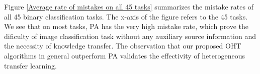 \documentclass[letterpaper]{article}
\begin{document}
Figure \ref{Average rate of mistakes on all 45 tasks} summarizes the mistake rates of all 45 binary classification tasks.
The x-axis of the figure refers to the 45 tasks.
We see that on most tasks, PA has the very high mistake rate, which prove the dificulty of image classification task without any auxiliary source information and the necessity of knowledge transfer.
The observation that our proposed OHT algorithms in general outperform PA validates the effectivity of heterogeneous transfer learning.

\begin{figure}[!htb]
\centering
  \\
\end{figure}
\end{document}
